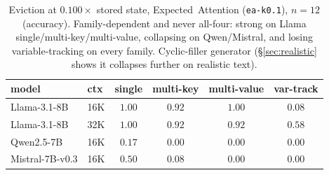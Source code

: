 \documentclass[11pt]{article}
\begin{document}
\begin{table}[t]
\centering
\caption{Eviction at $0.100\times$ stored state, Expected~Attention
(\texttt{ea-k0.1}), $n{=}12$ (accuracy). Family-dependent and never all-four:
strong on Llama single/multi-key/multi-value, collapsing on Qwen/Mistral, and
losing variable-tracking on every family. Cyclic-filler generator
(\S\ref{sec:realistic} shows it collapses further on realistic text).}
\label{tab:evict}
\begin{tabular}{llcccc}
\toprule
model & ctx & single & multi-key & multi-value & var-track \\
\midrule
Llama-3.1-8B    & 16K & $1.00$ & $0.92$ & $1.00$ & $0.08$ \\
Llama-3.1-8B    & 32K & $1.00$ & $0.92$ & $0.92$ & $0.58$ \\
Qwen2.5-7B      & 16K & $0.17$ & $0.00$ & $0.00$ & $0.00$ \\
Mistral-7B-v0.3 & 16K & $0.50$ & $0.08$ & $0.00$ & $0.00$ \\
\bottomrule
\end{tabular}
\end{table}
\end{document}
